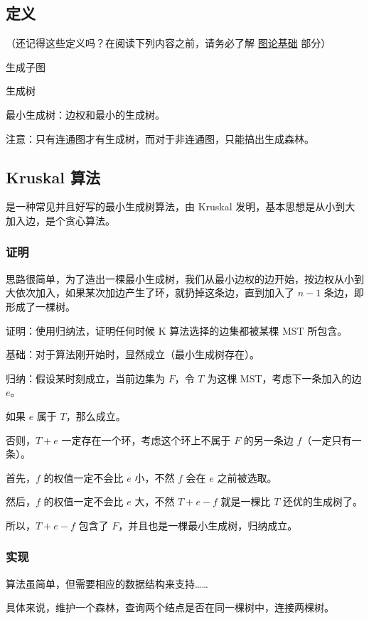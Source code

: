 
\subsection{定义}

（还记得这些定义吗？在阅读下列内容之前，请务必了解 \href{/graph/basic}{图论基础} 部分）

生成子图

生成树

最小生成树：边权和最小的生成树。

注意：只有连通图才有生成树，而对于非连通图，只能搞出生成森林。

\subsection{Kruskal 算法}

是一种常见并且好写的最小生成树算法，由 Kruskal 发明，基本思想是从小到大加入边，是个贪心算法。

\subsubsection{证明}

思路很简单，为了造出一棵最小生成树，我们从最小边权的边开始，按边权从小到大依次加入，如果某次加边产生了环，就扔掉这条边，直到加入了 $n-1$ 条边，即形成了一棵树。

证明：使用归纳法，证明任何时候 K 算法选择的边集都被某棵 MST 所包含。

基础：对于算法刚开始时，显然成立（最小生成树存在）。

归纳：假设某时刻成立，当前边集为 $F$，令 $T$ 为这棵 MST，考虑下一条加入的边 $e$。

如果 $e$ 属于 $T$，那么成立。

否则，$T+e$ 一定存在一个环，考虑这个环上不属于 $F$ 的另一条边 $f$（一定只有一条）。

首先，$f$ 的权值一定不会比 $e$ 小，不然 $f$ 会在 $e$ 之前被选取。

然后，$f$ 的权值一定不会比 $e$ 大，不然 $T+e-f$ 就是一棵比 $T$ 还优的生成树了。

所以，$T+e-f$ 包含了 $F$，并且也是一棵最小生成树，归纳成立。

\subsubsection{实现}

算法虽简单，但需要相应的数据结构来支持……

具体来说，维护一个森林，查询两个结点是否在同一棵树中，连接两棵树。

